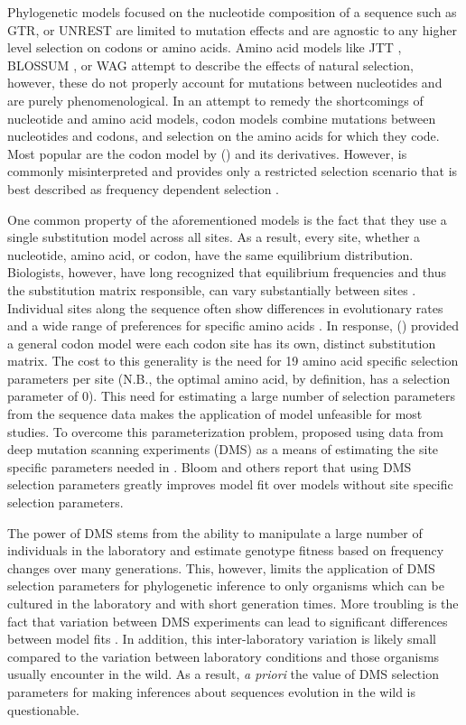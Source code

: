 \documentclass[fleqn,letterpaper]{article}
\begin{document}
Phylogenetic models focused on the nucleotide composition of a sequence such as GTR, or UNREST \citep{Tavare1986,Yang1994} are limited to mutation effects and are agnostic to any higher level selection on codons or amino acids.
Amino acid models like JTT \citep{jones1992}, BLOSSUM \citep{blossum}, or WAG \citep{whelan2001} attempt to describe the effects of natural selection, however, these do not properly account for mutations between nucleotides and are purely phenomenological.
In an attempt to remedy the shortcomings of nucleotide and amino acid models, codon models combine mutations between nucleotides and codons, and selection on the amino acids for which they code.
Most popular are the codon model by \citet{GoldmanAndYang1994} (\gy) and its derivatives.
However, \gy is commonly misinterpreted and provides only a restricted selection scenario that is best described as frequency dependent selection \citep{HughesAndNei1988,Nowak2006,Hughes2007,beaulieu2019}.

One common property of the aforementioned models is the fact that they use a single substitution model across all sites. 
As a result, every site, whether a nucleotide,  amino acid, or codon, have the same equilibrium distribution.
Biologists, however, have long recognized that equilibrium frequencies and thus the substitution matrix responsible, can vary substantially between sites \citep{felsenstein1981, gojobori1983}.
Individual sites along the sequence often show differences in evolutionary rates and a wide range of preferences for specific amino acids \citep{ashenberg2013, echave2016}.
In response, \citet{HalpernAndBruno1998} (\hb) provided a general codon model were each codon site has its own, distinct substitution matrix.
The cost to this generality is the need for 19 amino acid specific selection parameters per site (N.B., the optimal amino acid, by definition, has a selection parameter of 0).
This need for estimating a large number of selection parameters from the sequence data makes the application of \citet{HalpernAndBruno1998} model unfeasible for most studies.
To overcome this parameterization problem,\citet{bloom2014} proposed using data from deep mutation scanning experiments (DMS) as a means of estimating the site specific parameters needed in \hb.
Bloom and others \citep{bloom2014, bloom2017, hilton2017} report that using DMS selection parameters greatly improves model fit over models without site specific selection parameters.

The power of DMS stems from the ability to manipulate a large number of individuals in the laboratory and estimate genotype fitness based on frequency changes over many generations.
This, however, limits the application of DMS selection parameters for phylogenetic inference to only organisms which can be cultured in the laboratory and with short generation times.
More troubling is the fact that variation between DMS experiments can lead to significant differences between model fits \citep{hilton2017}.
In addition, this inter-laboratory variation is likely small compared to the variation between laboratory conditions and those organisms usually encounter in the wild.
As a result, \emph{a priori} the value of DMS selection parameters for making inferences about sequences evolution in the wild is questionable.
\end{document}
